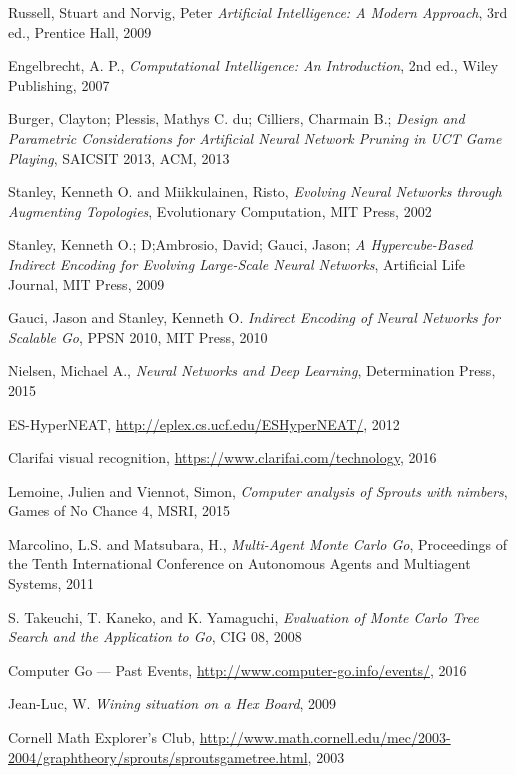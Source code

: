 \documentclass[12pt]{report}
\begin{document}
\begin{thebibliography}{99}
 Russell, Stuart and Norvig, Peter \emph{Artificial Intelligence: A Modern Approach}, 3rd ed., Prentice Hall, 2009

 Engelbrecht, A. P., \emph{Computational Intelligence: An Introduction}, 2nd ed., Wiley Publishing, 2007

 Burger, Clayton; Plessis, Mathys C. du; Cilliers, Charmain B.; \emph{Design and Parametric Considerations for Artiﬁcial Neural Network Pruning in UCT Game Playing}, SAICSIT 2013, ACM, 2013

 Stanley, Kenneth O. and Miikkulainen, Risto, \emph{Evolving Neural Networks through Augmenting Topologies}, Evolutionary Computation, MIT Press, 2002

 Stanley, Kenneth O.; D;Ambrosio, David; Gauci, Jason; \emph{A Hypercube-Based Indirect Encoding for Evolving Large-Scale Neural Networks}, Artificial Life Journal, MIT Press, 2009

 Gauci, Jason and Stanley, Kenneth O. \emph{Indirect Encoding of Neural Networks for Scalable Go}, PPSN 2010, MIT Press, 2010

 Nielsen, Michael A., \emph{Neural Networks and Deep Learning}, Determination Press, 2015

 ES-HyperNEAT, \url{http://eplex.cs.ucf.edu/ESHyperNEAT/}, 2012

 Clarifai visual recognition, \url{https://www.clarifai.com/technology}, 2016

 Lemoine, Julien and Viennot, Simon, \emph{Computer analysis of Sprouts with nimbers}, Games of No Chance 4, MSRI, 2015

 Marcolino, L.S. and Matsubara, H., \emph{Multi-Agent Monte Carlo Go},  Proceedings of the Tenth International Conference on Autonomous Agents and Multiagent Systems, 2011

 S. Takeuchi, T. Kaneko, and K. Yamaguchi, \emph{Evaluation of Monte Carlo Tree Search and the Application to Go}, CIG 08, 2008

 Computer Go --- Past Events, \url{http://www.computer-go.info/events/}, 2016

 Jean-Luc, W. \emph{Wining situation on a Hex Board}, 2009

 Cornell Math Explorer's Club, \url{http://www.math.cornell.edu/mec/2003-2004/graphtheory/sprouts/sproutsgametree.html}, 2003


\end{thebibliography}
\end{document}
